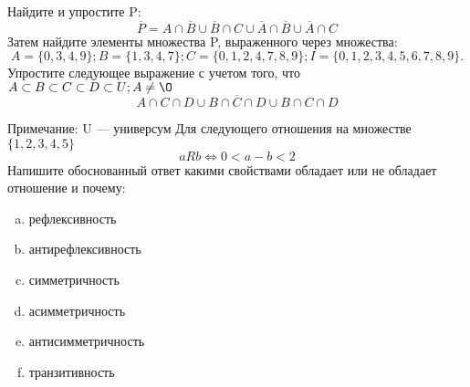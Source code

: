 \documentclass[10pt]{exam}
\begin{document}
\begin{questions}
\question
Найдите и упростите P:
\begin{equation*}
\overline{P} = A \cap \overline{B} \cup \overline{B} \cap C \cup \overline{A} \cap \overline{B} \cup \overline{A} \cap C
\end{equation*}
Затем найдите элементы множества P, выраженного через множества:
\begin{equation*}
A = \{0, 3, 4, 9\}; 
B = \{1, 3, 4, 7\};
C = \{0, 1, 2, 4, 7, 8, 9\};
I = \{0, 1, 2, 3, 4, 5, 6, 7, 8, 9\}.
\end{equation*}\question
Упростите следующее выражение с учетом того, что $A\subset B \subset C \subset D \subset U; A \neq \O$
\begin{equation*}
A \cap C  \cap D \cup B \cap \overline{C} \cap D \cup B \cap C \cap D
\end{equation*}

Примечание: U — универсум\question
Для следующего отношения на множестве $\{1, 2, 3, 4, 5\}$ 
\begin{equation*}
aRb \iff 0 < a-b<2
\end{equation*}
Напишите обоснованный ответ какими свойствами обладает или не обладает отношение и почему:   
\begin{enumerate} [a)]\setcounter{enumi}{0}
\item рефлексивность
\item антирефлексивность
\item симметричность
\item асимметричность
\item антисимметричность
\item транзитивность
\end{enumerate}


\end{questions}
\end{document}
